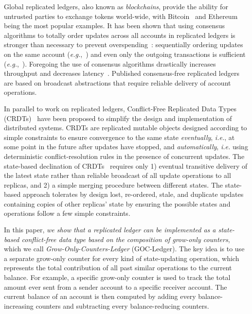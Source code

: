\documentclass[9pt]{article}   	%
\begin{document}
Global replicated ledgers, also known as \textit{blockchains}, provide the ability for untrusted parties to exchange tokens world-wide, with Bitcoin~\cite{nakamoto2008bitcoin} and Ethereum~\cite{buterin2014next} being the most popular examples. It has been shown that using consensus algorithms to totally order updates across all accounts in replicated ledgers is stronger than necessary to prevent overspending~\cite{guerraoui2021consensus}: sequentially ordering updates on the same account (\textit{e.g.},~\cite{frey:hal-03346756}) and even only the outgoing transactions is sufficient  (\textit{e.g.},~\cite{collins2020broadcast-payment}). Foregoing the use of consensus algorithms drastically increases throughput and decreases latency~\cite{collins2020broadcast-payment,baudet2020fastpay}. Published consensus-free replicated ledgers~\cite{collins2020broadcast-payment,baudet2020fastpay,sliwinski2020abc,guerraoui2021consensus,auvolat2021money,frey:hal-03346756,kuznetsov2021permissionless,cholvi2021bdso,georghiades2021needs} are based on broadcast abstractions that require reliable delivery of account operations. 

In parallel to work on replicated ledgers, Conflict-Free Replicated Data Types (CRDTs)~\cite{shapiro:hal-00932836} have been proposed to simplify the design and implementation of distributed systems. CRDTs are replicated mutable objects designed according to simple constraints to ensure convergence to the same state \textit{eventually}, \textit{i.e.}, at some point in the future after updates have stopped, and \textit{automatically}, \textit{i.e.} using deterministic conflict-resolution rules in the presence of concurrent updates. The state-based declination of CRDTs~\cite{shapiro:hal-00932836} requires only 1) eventual transitive delivery of the latest state rather than reliable broadcast of all update operations to all replicas, and 2) a simple merging procedure between different states. The state-based approach tolerates by design lost, re-ordered, stale, and duplicate updates containing copies of other replicas' state by ensuring the possible states and operations follow a few simple constraints.

In this paper, \textit{we show that a replicated ledger can be implemented as a state-based conflict-free data type based on the composition of grow-only counters}, which we call \textit{Grow-Only-Counters-Ledger} (GOC-Ledger). The key idea is to use a separate grow-only counter for every kind of state-updating operation, which represents the total contribution of all past similar operations to the current balance. For example, a specific grow-only counter is used to track the total amount ever sent  from a sender account to a specific receiver account. The current balance of an account is then computed by adding every balance-increasing counters and subtracting every balance-reducing counters. 
\end{document}
